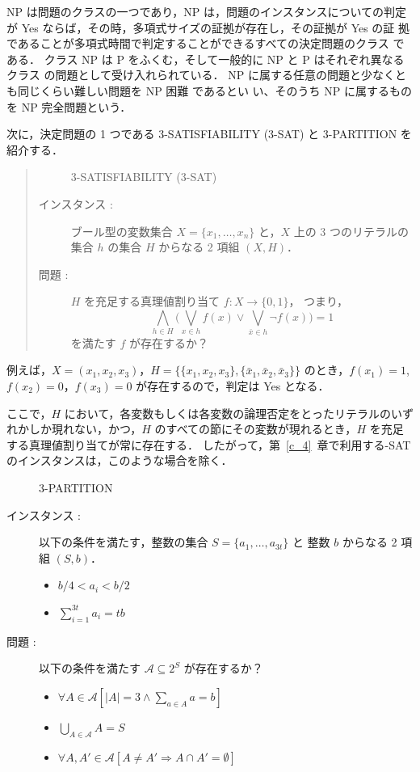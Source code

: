 \documentclass[12pt]{optlab-bachelor}
\begin{document}
NP は問題のクラスの一つであり，NP は，問題のインスタンスについての判定
が Yes ならば，その時，多項式サイズの証拠が存在し，その証拠が Yes の証
拠であることが多項式時間で判定することができるすべての決定問題のクラス
である．
クラス NP は P をふくむ，そして一般的に NP と P はそれぞれ異なるクラス
の問題として受け入れられている．
NP に属する任意の問題と少なくとも同じくらい難しい問題を NP 困難 であるとい
い、そのうち NP に属するものを NP 完全問題という．

次に，決定問題の 1 つである \textsc{3-SATISFIABILITY} (\textsc{3-SAT}) と \textsc{3-PARTITION} を紹介する．

\begin{quote}
  \begin{description}
    \item[] \textsc{3-SATISFIABILITY} (\textsc{3-SAT})
    \item[インスタンス : ] ブール型の変数集合 $X = \{x_1,\ldots,x_n\}$ と，$X$ 上の 3 つのリテラルの集合 $h$ の集合 $H$ からなる 2 項組 $(X,H)$．
    \item[問題 : ] $H$ を充足する真理値割り当て $f : X \to \{0,1\}$，
    つまり，
    \begin{displaymath}
      \displaystyle \bigwedge_{h \in H} \bigg(\bigvee_{x \in h}f(x) \lor
      \bigvee_{\bar x \in h}\lnot f(x) \bigg) = 1
    \end{displaymath}
    を満たす $f$ が存在するか？
  \end{description}
\end{quote}

例えば，$X = (x_1, x_2, x_3)$，$H = \{\{x_1, x_2,  x_3\}, \{\bar x_1, \bar x_2, \bar x_3\}\}$ のとき，$f(x_1) = 1$, $f(x_2) = 0$，$f(x_3) = 0$ が存在するので，判定は Yes となる．

ここで，$H$ において，各変数もしくは各変数の論理否定をとったリテラルのいずれかしか現れない，かつ，$H$ のすべての節にその変数が現れるとき，$H$ を充足する真理値割り当てが常に存在する．
したがって，第~\ref{c_4}~章で利用する{-SAT} のインスタンスは，このような場合を除く．

\begin{description}
  \item[] \textsc{3-PARTITION}
  \item[インスタンス : ] 以下の条件を満たす，整数の集合 $S = \{a_1,\ldots,a_{3t}\}$ と 整数 $b$ からなる 2 項組 $(S,b)$．
  \begin{itemize}
    \item $b/4 < a_i < b/2$
    \item $\displaystyle \sum_{i = 1}^{3t}a_i = tb$
  \end{itemize}
  \item[問題 : ] 以下の条件を満たす $\mathcal{A} \subseteq 2^S$ が存在するか？
  \begin{itemize}
    \item $\forall A \in \mathcal{A}[|A| = 3 \land \sum_{a \in A} a = b]$
    \item $\bigcup_{A \in \mathcal{A}} A = S$
    \item $\forall A, A' \in \mathcal{A}[A \neq A' \Rightarrow A \cap A' = \emptyset]$
  \end{itemize}
\end{description}
\end{document}
